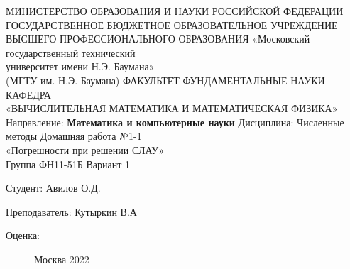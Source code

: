 \documentclass[12pt]{article}
\begin{document}
	
	\begin{center}
		МИНИСТЕРСТВО ОБРАЗОВАНИЯ И НАУКИ РОССИЙСКОЙ ФЕДЕРАЦИИ \\ ГОСУДАРСТВЕННОЕ БЮДЖЕТНОЕ ОБРАЗОВАТЕЛЬНОЕ УЧРЕЖДЕНИЕ \\ 
		ВЫСШЕГО ПРОФЕССИОНАЛЬНОГО ОБРАЗОВАНИЯ
		\vskip 1.5cm
		«Московский государственный технический \\
		университет имени Н.Э. Баумана» \\
		(МГТУ им. Н.Э. Баумана)
		\vskip 1.5cm
		ФАКУЛЬТЕТ ФУНДАМЕНТАЛЬНЫЕ НАУКИ \\
		КАФЕДРА \\
		«ВЫЧИСЛИТЕЛЬНАЯ МАТЕМАТИКА И МАТЕМАТИЧЕСКАЯ ФИЗИКА»
		\vskip 0.4cm
		Направление: \textbf{Математика и компьютерные науки}
		\vskip 0.4cm
		Дисциплина: Численные методы
		\vskip 0.4cm
		Домашняя работа №1-1 \\
		«Погрешности при решении СЛАУ» \\
		Группа ФН11-51Б
		\vskip 0.2cm
		Вариант 1
		
		
		\vskip 1.5cm
		\begin{flushright}
			Студент: Авилов О.Д.
			
			\vskip 1.5cm
			
			Преподаватель: Кутыркин В.А
		\end{flushright}
		Оценка:
		
		\begin{figure}[b]
			\begin{center}
				Москва 2022
			\end{center}
		\end{figure}
		
	\end{center}

\newpage
\end{document}
